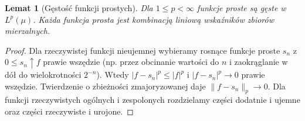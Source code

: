 \documentclass[11pt,a4paper]{article}
\numberwithin{equation}{section}
\theoremstyle{plain}
\newtheorem{lemat}[twierdzenie]{Lemat}
\theoremstyle{definition}
\theoremstyle{remark}
\begin{document}
\begin{lemat}[Gęstość funkcji prostych]
\label{lem:simple-dense12}
Dla $1\le p<\infty$ funkcje proste są gęste w $L^p(\mu)$.
Każda funkcja prosta jest kombinacją liniową wskaźników
zbiorów mierzalnych.
\end{lemat}
\begin{proof}
Dla rzeczywistej funkcji nieujemnej wybieramy rosnące funkcje
proste $s_n$ z $0\le s_n\uparrow f$ prawie wszędzie
(np. przez obcinanie wartości do $n$ i zaokrąglanie w dół
do wielokrotności $2^{-n}$). Wtedy
$|f-s_n|^p\le|f|^p$ i $|f-s_n|^p\to0$ prawie wszędzie.
Twierdzenie o zbieżności zmajoryzowanej daje
$\|f-s_n\|_p\to0$. Dla funkcji rzeczywistych ogólnych
i zespolonych rozdzielamy części dodatnie i ujemne
oraz części rzeczywiste i urojone.
\end{proof}
\end{document}
